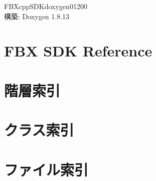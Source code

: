 \documentclass[twoside]{book}
\newcommand{\+}{\discretionary{\mbox{\scriptsize$\hookleftarrow$}}{}{}}
\newcommand{\clearemptydoublepage}{%
  \newpage{\pagestyle{empty}\cleardoublepage}%
}
\begin{document}
\hypersetup{pageanchor=false,
             bookmarksnumbered=true,
             pdfencoding=unicode
            }
\begin{titlepage}
\vspace*{7cm}
\begin{center}%
{\Large F\+B\+Xcpp\+S\+D\+Kdoxygen01200 }\\
\vspace*{1cm}
{\large 構築\+: Doxygen 1.8.13}\\
\end{center}
\end{titlepage}
\clearemptydoublepage
{}
\tableofcontents
\clearemptydoublepage
{}
\hypersetup{pageanchor=true}

\chapter{F\+BX S\+DK Reference}
\label{index}\hypertarget{index}{}
\chapter{階層索引}

\chapter{クラス索引}

\chapter{ファイル索引}

\end{document}
